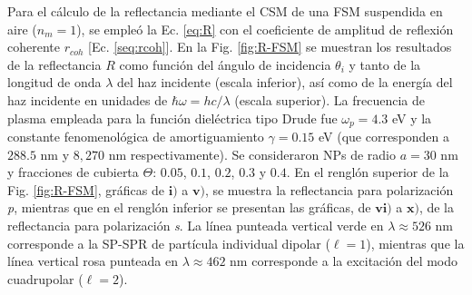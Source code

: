 Para el cálculo de la reflectancia mediante el CSM de una FSM suspendida en aire ($n_m=1$), se empleó la Ec.  \eqref{eq:R} con el coeficiente de amplitud de reflexión coherente $r_{coh}$ [Ec.  \eqref{seq:rcoh}].  En la Fig.  \ref{fig:R-FSM} se muestran los resultados de la reflectancia $R$ como función del ángulo de incidencia $\theta_i$ y tanto de la longitud de onda $\lambda$ del haz incidente (escala inferior), así como de la energía del haz incidente en unidades de $\hbar\omega = h c /\lambda$ (escala superior).  La frecuencia de plasma empleada para la función dieléctrica tipo Drude fue $\omega_p = 4. 3$ eV y la constante fenomenológica de amortiguamiento $\gamma = 0. 15$ eV (que corresponden a $288. 5$ nm  y $8,270$ nm respectivamente). Se consideraron NPs de radio $a=30$ nm y fracciones de cubierta $\Theta$: $0. 05$, $0. 1$, $0. 2$, $0. 3$ y $0. 4$. En el renglón superior de la Fig. \ref{fig:R-FSM}, gráficas de $\mathbf{i)}$ a $\mathbf{v)}$, se muestra la reflectancia para polarización \emph{p}, mientras que en el renglón inferior se presentan las gráficas, de $\mathbf{vi)}$ a $\mathbf{x)}$, de la reflectancia para polarización \emph{s}. La línea punteada vertical verde  en $\lambda \approx 526$ nm corresponde a la SP-SPR de partícula individual dipolar ($\ell = 1$), mientras que la línea vertical rosa punteada en $\lambda \approx 462$ nm corresponde a la excitación del modo cuadrupolar ($\ell=2$).
					
